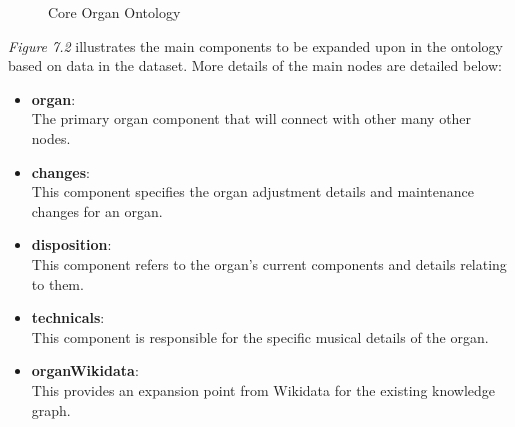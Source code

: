 \begin{figure}[H]
    \begin{center}
    \end{center}
    \vspace{-0.4cm}
\caption{Core Organ Ontology}
\end{figure}
\vspace{-0.1cm}

\textit{Figure 7.2} illustrates the main components to be expanded upon in the ontology based on data in the dataset. More details of the main nodes are detailed below:

\vspace{-0.1cm}
\begin{itemize}
    \item \textbf{organ}: \vspace{-0.075cm}\\ The primary organ component that will connect with other many other nodes.
    \vspace{-0.15cm}
    \item \textbf{changes}:\vspace{-0.075cm}\\ This component specifies the organ adjustment details and maintenance changes for an organ.
    \vspace{-0.15cm}
    \item \textbf{disposition}:\vspace{-0.075cm}\\ This component refers to the organ's current components and details relating to them.
    \vspace{-0.15cm}
    \item \textbf{technicals}: \vspace{-0.075cm}\\This component is responsible for the specific musical details of the organ. 
    \vspace{-0.15cm}
    \item \textbf{organWikidata}:\vspace{-0.075cm} \\This provides an expansion point from Wikidata for the existing knowledge graph.
\end{itemize}

